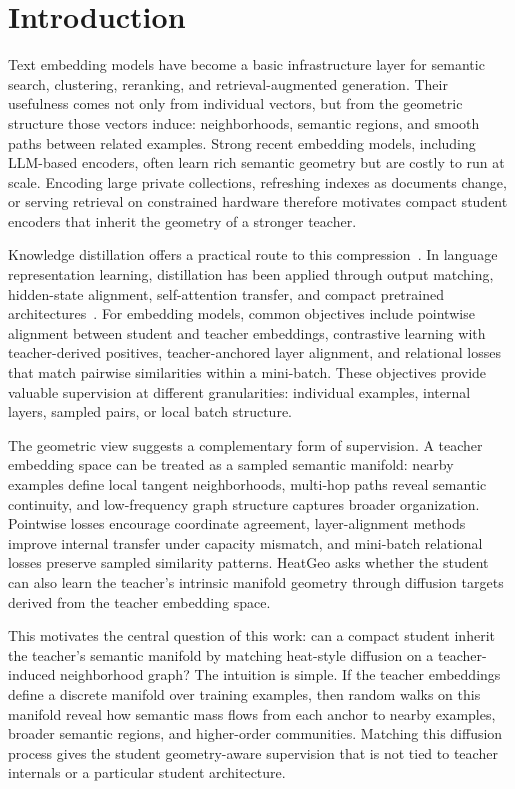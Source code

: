 \section{Introduction}

Text embedding models have become a basic infrastructure layer for semantic search, clustering, reranking, and retrieval-augmented generation. Their usefulness comes not only from individual vectors, but from the geometric structure those vectors induce: neighborhoods, semantic regions, and smooth paths between related examples. Strong recent embedding models, including LLM-based encoders, often learn rich semantic geometry but are costly to run at scale. Encoding large private collections, refreshing indexes as documents change, or serving retrieval on constrained hardware therefore motivates compact student encoders that inherit the geometry of a stronger teacher.

Knowledge distillation offers a practical route to this compression~\citep{hinton2015distilling}. In language representation learning, distillation has been applied through output matching, hidden-state alignment, self-attention transfer, and compact pretrained architectures~\citep{sanh2019distilbert,jiao2019tinybert,wang2020minilm,xu2024survey}. For embedding models, common objectives include pointwise alignment between student and teacher embeddings, contrastive learning with teacher-derived positives, teacher-anchored layer alignment, and relational losses that match pairwise similarities within a mini-batch. These objectives provide valuable supervision at different granularities: individual examples, internal layers, sampled pairs, or local batch structure.

The geometric view suggests a complementary form of supervision. A teacher embedding space can be treated as a sampled semantic manifold: nearby examples define local tangent neighborhoods, multi-hop paths reveal semantic continuity, and low-frequency graph structure captures broader organization. Pointwise losses encourage coordinate agreement, layer-alignment methods improve internal transfer under capacity mismatch, and mini-batch relational losses preserve sampled similarity patterns. HeatGeo asks whether the student can also learn the teacher's intrinsic manifold geometry through diffusion targets derived from the teacher embedding space.

This motivates the central question of this work: can a compact student inherit the teacher's semantic manifold by matching heat-style diffusion on a teacher-induced neighborhood graph? The intuition is simple. If the teacher embeddings define a discrete manifold over training examples, then random walks on this manifold reveal how semantic mass flows from each anchor to nearby examples, broader semantic regions, and higher-order communities. Matching this diffusion process gives the student geometry-aware supervision that is not tied to teacher internals or a particular student architecture.

